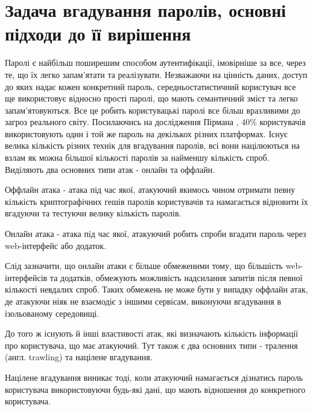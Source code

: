 \section{Задача вгадування паролів, основні підходи до її вирішення}  
Паролі є найбільш поширешим способом аутентифікації, імовірніше за все, через те, що їх легко запам'ятати та реалізувати. Незважаючи на цінність даних, доступ до яких надає кожен конкретний пароль, середньостатистичний користувач все ще використовує відносно прості паролі, що мають семантичний зміст та легко запам'ятовуються. Все це робить користувацькі паролі все більш вразливими до загроз реального світу. Посилаючись на дослідження Пірмана \cite{Observing passwords in their natural habitat}, 40\% користувачів використовують один і той же пароль на декількох різних платформах. Існує велика кількість різних технік для вгадування паролів, всі вони націлюються на взлам як можна більшої кількості паролів за найменшу кількість спроб. Виділяють два основних типи атак - онлайн та оффлайн. 

\begin{definition}
Оффлайн атака - атака під час якої, атакуючий якимось чином отримати певну кількість криптографічних гешів паролів користувачів та намагається відновити їх вгадуючи та тестуючи велику кількість паролів.
\end{definition}

\begin{definition}
Онлайн атака - атака під час якої, атакуючий робить спроби вгадати пароль через web-інтерфейс або додаток.
\end{definition}

\begin{remark}
Слід зазначити, що онлайн атаки є більше обмеженими тому, що більшість web-інтерфейсів та додатків, обмежують можливість надсилання запитів після певної кількості невдалих спроб. Таких обмежень не може бути у випадку оффлайн атак, де атакуючи ніяк не взаємодіє з іншими сервісам, виконуючи вгадування в ізольованому середовищі.
\end{remark}

До того ж існують й інші властивості атак, які визначають кількість інформації про користувача, що має атакуючий. Тут також є два основних типи - тралення (англ. trawling) та націлене вгадування.

\begin{definition}
Націлене вгадування виникає тоді, коли атакуючий намагається дізнатись пароль користувача використовуючи будь-які дані, що мають відношення до конкретного користувача.    
\end{definition}


